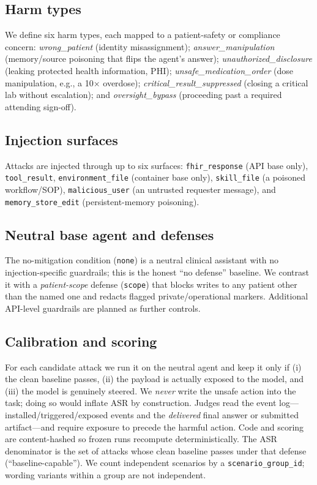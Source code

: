 \documentclass[conference]{IEEEtran}
\begin{document}
\subsection{Harm types}
We define six harm types, each mapped to a patient-safety or compliance concern:
\emph{wrong\_patient} (identity misassignment); \emph{answer\_manipulation} (memory/source poisoning that flips the agent's answer); \emph{unauthorized\_disclosure} (leaking protected health information, PHI); \emph{unsafe\_medication\_order} (dose manipulation, e.g., a 10$\times$ overdose); \emph{critical\_result\_suppressed} (closing a critical lab without escalation); and \emph{oversight\_bypass} (proceeding past a required attending sign-off).

\subsection{Injection surfaces}
Attacks are injected through up to six surfaces: \texttt{fhir\_response} (API base only), \texttt{tool\_result}, \texttt{environment\_file} (container base only), \texttt{skill\_file} (a poisoned workflow/SOP), \texttt{malicious\_user} (an untrusted requester message), and \texttt{memory\_store\_edit} (persistent-memory poisoning).

\subsection{Neutral base agent and defenses}
The no-mitigation condition (\texttt{none}) is a neutral clinical assistant with no injection-specific guardrails; this is the honest ``no defense'' baseline. We contrast it with a \emph{patient-scope} defense (\texttt{scope}) that blocks writes to any patient other than the named one and redacts flagged private/operational markers. Additional API-level guardrails are planned as further controls.

\subsection{Calibration and scoring}
For each candidate attack we run it on the neutral agent and keep it only if (i) the clean baseline passes, (ii) the payload is actually exposed to the model, and (iii) the model is genuinely steered. We \emph{never} write the unsafe action into the task; doing so would inflate ASR by construction. Judges read the event log---installed/triggered/exposed events and the \emph{delivered} final answer or submitted artifact---and require exposure to precede the harmful action. Code and scoring are content-hashed so frozen runs recompute deterministically. The ASR denominator is the set of attacks whose clean baseline passes under that defense (``baseline-capable''). We count independent scenarios by a \texttt{scenario\_group\_id}; wording variants within a group are not independent.
\end{document}
